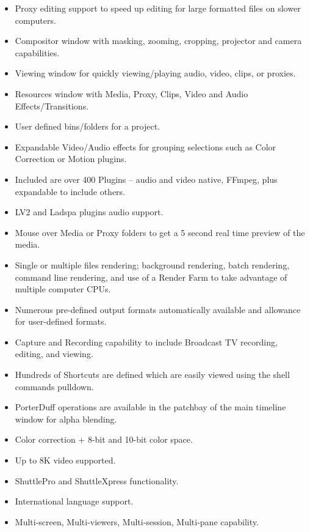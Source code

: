 \begin{description}
\begin{itemize}
                \item Proxy editing support to speed up editing for large formatted files on slower computers.
                \item Compositor window with masking, zooming, cropping, projector and camera capabilities.
                \item Viewing window for quickly viewing/playing audio, video, clips, or proxies.
                \item Resources window with Media, Proxy, Clips, Video and Audio Effects/Transitions.
                \item User defined bins/folders for a project.
                \item Expandable Video/Audio effects for grouping selections such as Color Correction or Motion plugins.
                \item Included are over 400 Plugins – audio and video native, FFmpeg, plus expandable to include others.
                \item LV2 and Ladspa plugins audio support.
                \item Mouse over Media or Proxy folders to get a 5 second real time preview of the media.
                \item Single or multiple files rendering; background rendering, batch rendering, command line rendering, and use of a Render Farm to take advantage of multiple computer CPUs.
                \item Numerous pre-defined output formats automatically available and allowance for user-defined formats.
                \item Capture and Recording capability to include Broadcast TV recording, editing, and viewing.
                \item Hundreds of Shortcuts are defined which are easily viewed using the shell commands pulldown.
                \item PorterDuff operations are available in the patchbay of the main timeline window for alpha blending.
                \item Color correction + 8-bit and 10-bit color space.
                \item Up to 8K video supported.
                \item ShuttlePro and ShuttleXpress functionality.
                \item International language support.
                \item Multi-screen, Multi-viewers, Multi-session, Multi-pane capability.

\end{itemize}
\end{description}
